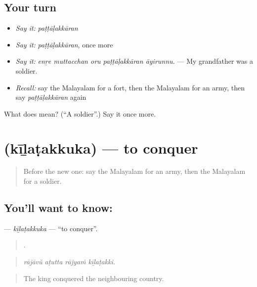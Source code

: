\subsection*{Your turn}
\begin{itemize}
\raggedright
  \item \emph{Say it:} \emph{paṭṭāḷakkāran}
  \item \emph{Say it:} \emph{paṭṭāḷakkāran}, once more
  \item \emph{Say it:} \emph{enṟe muttacchan oru paṭṭāḷakkāran āyirunnu.} — My grandfather was a soldier.
  \item \emph{Recall:} say the Malayalam for a fort, then the Malayalam for an army, then say \emph{paṭṭāḷakkāran} again
\end{itemize}

\begin{tcolorbox}[breakable,colback=teal!4,colframe=teal!35!black,title={Before you move on}]
What does  mean? (\textquotedblleft{}A soldier\textquotedblright{}.) Say it once more.
\end{tcolorbox}
\section[\texorpdfstring{\ml{കീഴടക്കുക} (kīḻaṭakkuka)}{കീഴടക്കുക (kīḻaṭakkuka)}]{ (kīḻaṭakkuka) — to conquer}

\label{lesson:ML-C399-kilatakkuka}



\begin{quote}
Before the new one: say the Malayalam for an army, then the Malayalam for a soldier.
\end{quote}

\subsection*{You'll want to know: }
\textbf{} — \emph{kīḻaṭakkuka} — \textquotedblleft{}to conquer\textquotedblright{}.

\begin{quote}
   .
\end{quote}

\begin{quote}
\emph{rājāvŭ aṭutta rājyaṁ kīḻaṭakki.}
\end{quote}

\begin{quote}
The king conquered the neighbouring country.
\end{quote}


